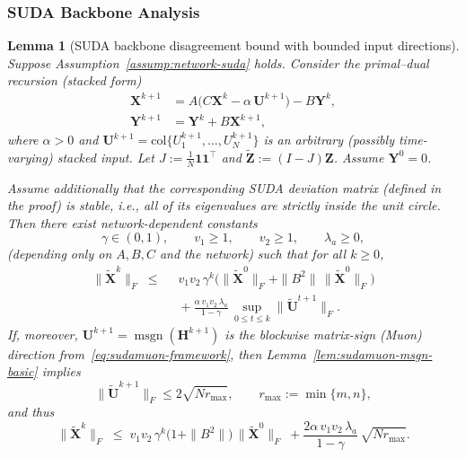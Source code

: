 \documentclass{article}
\newtheorem{lemma}{Lemma}
\begin{document}
\subsubsection*{SUDA Backbone Analysis}

\begin{lemma}[SUDA backbone disagreement bound with bounded input directions]
\label{lem:sudamuon-suda-consensus-bounded-input}
Suppose Assumption~\ref{assump:network-suda} holds.
Consider the primal--dual recursion (stacked form)
\begin{equation}
\label{eq:sudamuon-suda-backbone-only}
\begin{aligned}
    \mathbf{X}^{k+1} &= A\bigl(C\mathbf{X}^k-\alpha\,\mathbf{U}^{k+1}\bigr)-B\mathbf{Y}^k,\\
    \mathbf{Y}^{k+1} &= \mathbf{Y}^k + B\mathbf{X}^{k+1},
\end{aligned}
\end{equation}
where $\alpha>0$ and $\mathbf{U}^{k+1}=\mathrm{col}\{U_1^{k+1},\ldots,U_N^{k+1}\}$ is an arbitrary (possibly time-varying) stacked input.
Let $J:=\tfrac{1}{N}\mathbf{1}\mathbf{1}^\top$ and $\tilde{\mathbf{Z}}:=(I-J)\mathbf{Z}$.
Assume $\mathbf Y^0=0$.

Assume additionally that the corresponding \emph{SUDA deviation matrix} (defined in the proof) is stable, i.e., all of its eigenvalues are strictly inside the unit circle.
Then there exist network-dependent constants
\[
    \gamma\in(0,1),\qquad v_1\ge 1,\qquad v_2\ge 1,\qquad \lambda_a\ge 0,
\]
(depending only on $A,B,C$ and the network) such that for all $k\ge 0$,
\begin{equation}
\label{eq:sudamuon-suda-consensus-bounded-input}
\begin{split}
\|\tilde{\mathbf{X}}^k\|_F
\;\le\;&\;
 v_1v_2\,\gamma^k\Big(\|\tilde{\mathbf{X}}^0\|_F+\|B^2\|\,\|\tilde{\mathbf{X}}^0\|_F\Big)
\\&\;+
\frac{\alpha\,v_1v_2\,\lambda_a}{1-\gamma}\,\sup_{0\le t\le k}\|\tilde{\mathbf{U}}^{t+1}\|_F.
\end{split}
\end{equation}
If, moreover, $\mathbf{U}^{k+1}=\operatorname{msgn}(\mathbf{H}^{k+1})$ is the blockwise matrix-sign (Muon) direction from~\eqref{eq:sudamuon-framework}, then Lemma~\ref{lem:sudamuon-msgn-basic} implies
\begin{equation}
\label{eq:sudamuon-suda-consensus-bounded-input-bdd}
\|\tilde{\mathbf{U}}^{k+1}\|_F \le 2\sqrt{Nr_{\max}},\qquad r_{\max}:=\min\{m,n\},
\end{equation}
and thus
\[
\|\tilde{\mathbf{X}}^k\|_F
\;\le\;
 v_1v_2\,\gamma^k\bigl(1+\|B^2\|\bigr)\,\|\tilde{\mathbf{X}}^0\|_F
\;+
\frac{2\alpha\,v_1v_2\,\lambda_a}{1-\gamma}\,\sqrt{Nr_{\max}}.
\]
\end{lemma}
\end{document}
